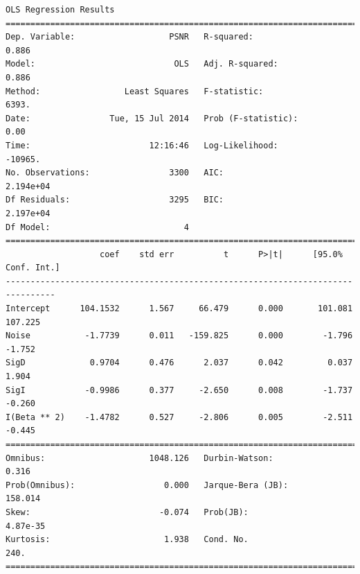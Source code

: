 \documentclass[11pt]{article}
\theoremstyle{definition}
\begin{document}
{\begin{lstlisting}[caption = Time Series 2 - Bilateral Non-Local Means Filter OLS Model, label = {bilateralnlmeans2}]
                            OLS Regression Results                            
==============================================================================
Dep. Variable:                   PSNR   R-squared:                       0.886
Model:                            OLS   Adj. R-squared:                  0.886
Method:                 Least Squares   F-statistic:                     6393.
Date:                Tue, 15 Jul 2014   Prob (F-statistic):               0.00
Time:                        12:16:46   Log-Likelihood:                -10965.
No. Observations:                3300   AIC:                         2.194e+04
Df Residuals:                    3295   BIC:                         2.197e+04
Df Model:                           4                                         
================================================================================
                   coef    std err          t      P>|t|      [95.0% Conf. Int.]
--------------------------------------------------------------------------------
Intercept      104.1532      1.567     66.479      0.000       101.081   107.225
Noise           -1.7739      0.011   -159.825      0.000        -1.796    -1.752
SigD             0.9704      0.476      2.037      0.042         0.037     1.904
SigI            -0.9986      0.377     -2.650      0.008        -1.737    -0.260
I(Beta ** 2)    -1.4782      0.527     -2.806      0.005        -2.511    -0.445
==============================================================================
Omnibus:                     1048.126   Durbin-Watson:                   0.316
Prob(Omnibus):                  0.000   Jarque-Bera (JB):              158.014
Skew:                          -0.074   Prob(JB):                     4.87e-35
Kurtosis:                       1.938   Cond. No.                         240.
==============================================================================
\end{lstlisting}

}
\end{document}
